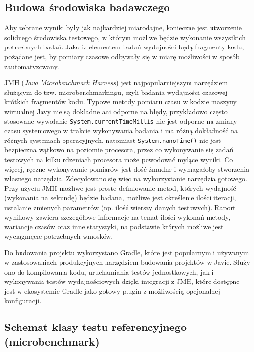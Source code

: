 \documentclass[12pt]{extarticle}
\begin{document}
\subsection{Budowa środowiska badawczego}

    Aby zebrane wyniki były jak najbardziej miarodajne, konieczne jest utworzenie solidnego środowiska testowego, w którym możliwe będzie wykonanie wszystkich potrzebnych badań. Jako iż elementem badań wydajności będą fragmenty kodu, pożądane jest, by pomiary czasowe odbywały się w miarę możliwości w sposób zautomatyzowany.

    JMH (\textit{Java Microbenchmark Harness}) jest najpopularniejszym narzędziem służącym do tzw. microbenchmarkingu, czyli badania wydajności czasowej krótkich fragmentów kodu. Typowe metody pomiaru czasu w kodzie maszyny wirtualnej Javy nie są dokładne ani odporne na błędy, przykładowo często stosowane wywołanie \texttt{System.currentTimeMillis} nie jest odporne na zmiany czasu systemowego w trakcie wykonywania badania i ma różną dokładność na różnych systemach operacyjnych, natomiast \texttt{System.nanoTime()} nie jest bezpieczna wątkowo na poziomie procesora, przez co wykonywanie się zadań testowych na kilku rdzeniach procesora może powodować mylące wyniki. Co więcej, ręczne wykonywanie pomiarów jest dość żmudne i wymagałoby stworzenia własnego narzędzia. Zdecydowano się więc na wykorzystanie narzędzia gotowego. Przy użyciu JMH możliwe jest proste definiowanie metod, których wydajność (wykonania na sekundę) będzie badana, możliwe jest określenie ilości iteracji, ustalanie zmienych parametrów (np. ilość wierszy danych testowych). Raport wynikowy zawiera szczegółowe informacje na temat ilości wykonań metody, wariancje czasów oraz inne statystyki, na podstawie których możliwe jest wyciągnięcie potrzebnych wniosków.

    Do budowania projektu wykorzystano Gradle, które jest popularnym i używanym w zastosowaniach produkcyjnych narzędziem budowania projektów w Javie. Służy ono do kompilowania kodu, uruchamiania testów jednostkowych, jak i wykonywania testów wydajnościowych dzięki integracji z JMH, które dostępne jest w ekosystemie Gradle jako gotowy plugin z możliwością opcjonalnej konfiguracji.

\subsection{Schemat klasy testu referencyjnego (microbenchmark)}
\end{document}
